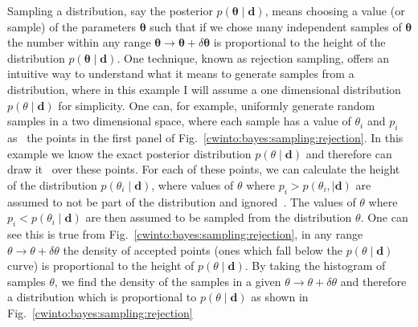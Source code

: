 Sampling a distribution, say the posterior $p(\bm{\theta} \mid \bm{d})$, means
choosing a value (or sample) of the parameters $\bm{\theta}$ such that if we
chose many independent samples of $\bm{\theta}$ the number within any range
$\bm{\theta} \rightarrow \bm{\theta} + \delta \bm{\theta}$ is proportional to
the height of the distribution $p(\bm{\theta} \mid \bm{d})$.  One technique,
known as rejection sampling, offers an intuitive way to understand what it
means to generate samples from a distribution, where in this example I will
assume a one dimensional distribution $p(\theta \mid \bm{d})$ for simplicity.
One can, for example, uniformly generate random samples in a two dimensional
space, where each sample has a value of $\theta_i$ and $p_i$
as~ the points in
the first panel of Fig.~\ref{cwinto:bayes:sampling:rejection}.  In this example
we know the exact posterior distribution $p(\theta \mid \bm{d})$ and therefore
can draw it~ over these points.  For each of these points, we can calculate the
height of the distribution $p(\theta_i \mid \bm{d})$, where values of $\theta$
where $p_i > p(\theta_i, \mid \bm{d})$ are assumed to not be part of the
distribution and ignored~. The values of $\theta$ where $p_i < p(\theta_i \mid
\bm{d})$ are then assumed to be sampled from the distribution $\theta$.  One
can see this is true from Fig.~\ref{cwinto:bayes:sampling:rejection}, in any
range $\theta \rightarrow \theta + \delta \theta$ the density of accepted
points (ones which fall below the $p(\theta \mid \bm{d})$ curve) is
proportional to the height of $p(\theta \mid \bm{d})$.  By taking the histogram
of samples $\theta$, we find the density of the samples in a given $\theta
\rightarrow \theta + \delta \theta$ and therefore a distribution which is
proportional to $p(\theta \mid \bm{d})$ as shown in
Fig.~\ref{cwinto:bayes:sampling:rejection} 

